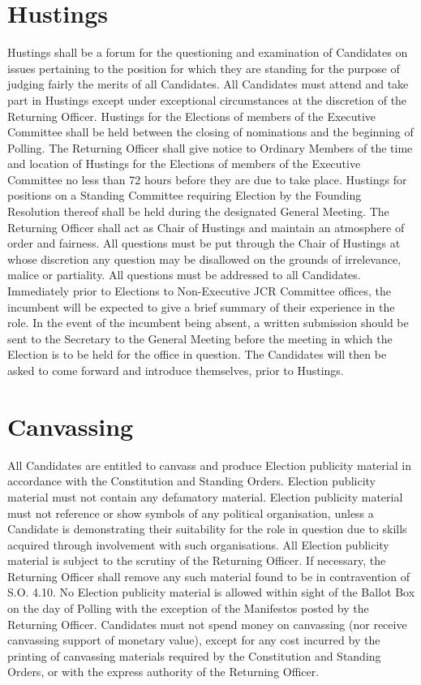 \section{Hustings}
\npara Hustings shall be a forum for the questioning and examination of Candidates on issues pertaining to the position for which they are standing for the purpose of judging fairly the merits of all Candidates.
\npara All Candidates must attend and take part in Hustings except under exceptional circumstances at the discretion of the Returning Officer.
\npara Hustings for the Elections of members of the Executive Committee shall be held between the closing of nominations and the beginning of Polling. The Returning Officer shall give notice to Ordinary Members of the time and location of Hustings for the Elections of members of the Executive Committee no less than 72 hours before they are due to take place.
\npara Hustings for positions on a Standing Committee requiring Election by the Founding Resolution thereof shall be held during the designated General Meeting.
\npara The Returning Officer shall act as Chair of Hustings and maintain an atmosphere of order and fairness.
\npara All questions must be put through the Chair of Hustings at whose discretion any question may be disallowed on the grounds of irrelevance, malice or partiality.
\npara All questions must be addressed to all Candidates.
\npara Immediately prior to Elections to Non-Executive JCR Committee offices, the incumbent will be expected to give a brief summary of their experience in the role.  In the event of the incumbent being absent, a written submission should be sent to the Secretary to the General Meeting before the meeting in which the Election is to be held for the office in question. The Candidates will then be asked to come forward and introduce themselves, prior to Hustings.
\section{Canvassing}
\npara All Candidates are entitled to canvass and produce Election publicity material in accordance with the Constitution and Standing Orders.
\npara Election publicity material must not contain any defamatory material.
\npara Election publicity material must not reference or show symbols of any political organisation, unless a Candidate is demonstrating their suitability for the role in question due to skills acquired through involvement with such organisations.
\npara All Election publicity material is subject to the scrutiny of the Returning Officer. If necessary, the Returning Officer shall remove any such material found to be in contravention of S.O. 4.10.
% 
% 
\npara No Election publicity material is allowed within sight of the Ballot Box on the day of Polling with the exception of the Manifestos posted by the Returning Officer.
\npara Candidates must not spend money on canvassing (nor receive canvassing support of monetary value), except for any cost incurred by the printing of canvassing materials required by the Constitution and Standing Orders, or with the express authority of the Returning Officer.
